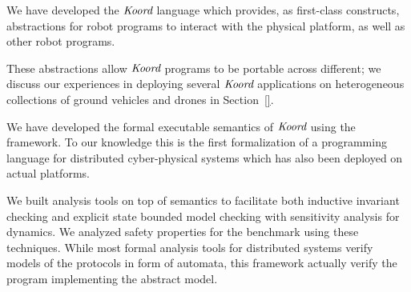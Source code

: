 \begin{noinditem}

\item  {We have developed the $\emph{Koord}$ language which provides, as first-class constructs,  abstractions for robot  programs to interact with the physical platform, as well as other robot programs.}
\item These abstractions allow $\emph{Koord}$ programs to be portable across different; we  discuss our experiences in deploying several $\emph{Koord}$ applications on heterogeneous collections of ground vehicles and drones in Section~\ref{}. 
\item  We have developed the formal executable semantics of $\emph{Koord}$ using the \K framework. To our knowledge this is the first formalization of a programming language for distributed cyber-physical systems which has also been deployed on actual platforms.
\item  We built analysis tools on top of semantics to facilitate both inductive invariant checking and explicit state bounded model checking with sensitivity analysis for dynamics. We analyzed safety properties for the benchmark using these techniques. While most formal analysis tools for distributed systems verify models of the protocols in form of automata, this framework actually verify the program implementing the abstract model. 


\end{noinditem}
